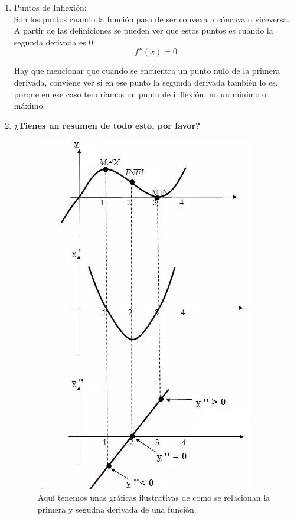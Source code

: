 \documentclass[arial,a4paper,print]{article}
\begin{document}
\begin{enumerate}
\item Puntos de Inflexión:\\
Son los puntos cuando la función pasa de ser convexa a cóncava o viceversa. A partir de las definiciones se pueden ver que estos puntos es cuando la segunda derivada es $0$:
\begin{equation*}
	f''(x) = 0
\end{equation*}

Hay que mencionar que cuando se encuentra un punto nulo de la primera derivada, conviene ver si en ese punto la segunda derivada también lo es, porque en ese caso tendríamos un punto de inflexión, no un mínimo o máximo. 

\item \textbf{¿Tienes un resumen de todo esto, por favor?}\\
\begin{figure}[H]
	\centering
	\includegraphics[width=0.3\linewidth]{figures/second_derivative}
	\caption{Aquí tenemos unas gráficas ilustrativas de como se relacionan la primera y segudna derivada de una función.}
	\label{fig:secondderivative}
\end{figure}


\end{enumerate}
\end{document}
